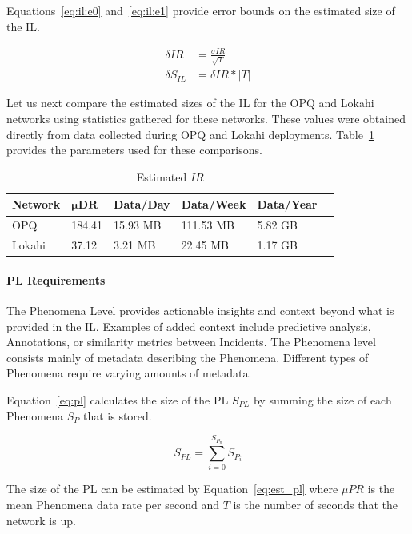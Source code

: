 Equations~\ref{eq:il:e0} and~\ref{eq:il:e1} provide error bounds on the estimated size of the IL\@.

\begin{align}
	\delta IR &= \frac{\sigma IR}{\sqrt{T}} \label{eq:il:e0} \\
	\delta S_{IL} &= \delta IR * |T| \label{eq:il:e1}
\end{align}

Let us next compare the estimated sizes of the IL for the OPQ and Lokahi networks using statistics gathered for these networks. These values were obtained directly from data collected during OPQ and Lokahi deployments. Table~\ref{table:estimated_mu_ir} provides the parameters used for these comparisons.

\begin{table}[H]
	\centering
	\caption{Estimated $IR$}
	\begin{tabularx}{\textwidth}{llllll}
		\toprule
		\textbf{Network} & $\bm{\mu DR}$ & \textbf{Data/Day} & \textbf{Data/Week} & \textbf{Data/Year} \\
		\midrule
		OPQ & 184.41 & 15.93 MB & 111.53 MB & 5.82 GB \\
		Lokahi & 37.12 & 3.21 MB & 22.45 MB & 1.17 GB \\
		\bottomrule
	\end{tabularx}
	\label{table:estimated_mu_ir}
\end{table}

\paragraph{PL Requirements}
The Phenomena Level provides actionable insights and context beyond what is provided in the IL. Examples of added context include predictive analysis, Annotations, or similarity metrics between Incidents. The Phenomena level consists mainly of metadata describing the Phenomena. Different types of Phenomena require varying amounts of metadata.

Equation~\ref{eq:pl} calculates the size of the PL $S_{PL}$ by summing the size of each Phenomena $S_{P}$ that is stored.

\begin{equation}\label{eq:pl}
	S_{PL} = \sum_{i=0}^{S_{P_{n}}} S_{P_{i}}
\end{equation}

The size of the PL can be estimated by Equation~\ref{eq:est_pl} where $\mu PR$ is the mean Phenomena data rate per second and $T$ is the number of seconds that the network is up.

